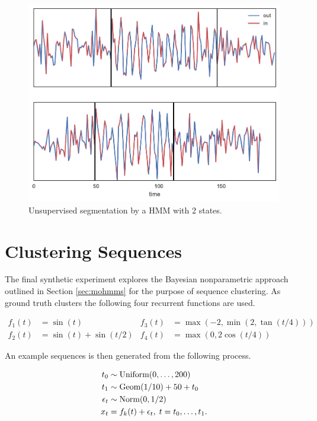 \documentclass[12pt]{report}
\newcommand{\1}[0]{\mathbbm{1}}
\newcommand{\Unif}[0]{\textnormal{Uniform}}
\newcommand{\Norm}[0]{\textnormal{Norm}}
\newcommand{\Geom}[0]{\textnormal{Geom}}
\begin{document}
\begin{figure}[H]
    \centering
    \includegraphics[width=1\textwidth]{img/artificial-segment-output-flat.pdf}
    \caption{Unsupervised segmentation by a \ac{HMM} with 2 states.}
    \label{fig:artificial-segmentation-flat}
\end{figure}

\section{Clustering Sequences}
The final synthetic experiment explores the Bayesian nonparametric approach outlined in 
Section \ref{sec:mohmms} for the purpose of sequence clustering. As ground truth clusters
the following four recurrent functions are used.

\begin{align*}
    f_1(t) &= \sin(t) & 
    f_3(t) &= \max(-2, \min(2, \tan(t/4))) \\
    f_2(t) &= \sin(t) + \sin(t/2) &
    f_4(t) &= \max(0, 2 \cos(t/ 4))
\end{align*}

An example sequences is then generated from the following process.

\begin{align*}
    t_0 & \sim \Unif({0, \ldots, 200}) \\
    t_1 & \sim \Geom(1/10) + 50 + t_0 \\
    \epsilon_t & \sim \Norm(0, 1/2) \\
    x_t &= f_k(t) + \epsilon_t,\; t=t_0,\ldots,t_1.
\end{align*}
\end{document}
